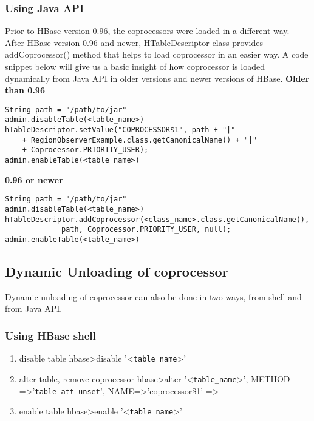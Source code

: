 \documentclass[11pt,a4paper,bibtotoc,idxtotoc,headsepline,footsepline,footexclude,BCOR12mm,DIV13]{scrbook}
\begin{document}
\subsubsection{Using Java API}
Prior to HBase version 0.96, the coprocessors were loaded in a different way. After HBase version 0.96 and newer, HTableDescriptor class provides addCoprocessor() method that helps to load coprocessor in an easier way. A code snippet\cite{loading:coprocessors} below will give us a basic insight of how coprocessor is loaded dynamically from Java API in older versions and newer versions of HBase.
\newline \newline
\textbf{Older than 0.96} \newline
\lstset{language=Java}
\begin{lstlisting}
String path = "/path/to/jar"
admin.disableTable(<table_name>)
hTableDescriptor.setValue("COPROCESSOR$1", path + "|"
    + RegionObserverExample.class.getCanonicalName() + "|"
    + Coprocessor.PRIORITY_USER);
admin.enableTable(<table_name>)
\end{lstlisting}

\textbf{0.96 or newer} \newline
\lstset{language=Java}
\begin{lstlisting}
String path = "/path/to/jar"
admin.disableTable(<table_name>)
hTableDescriptor.addCoprocessor(<class_name>.class.getCanonicalName(),
             path, Coprocessor.PRIORITY_USER, null);
admin.enableTable(<table_name>)
\end{lstlisting}

\subsection{Dynamic Unloading of coprocessor}
Dynamic unloading of coprocessor can also be done in two ways, from shell and from Java API. 

\subsubsection{Using HBase shell}
\begin{enumerate}
    \item disable table
    hbase\textgreater disable '\textless \texttt{table\_name}\textgreater'
    \item alter table, remove coprocessor
    hbase\textgreater alter '\textless \texttt{table\_name}\textgreater', \newline
    METHOD =\textgreater '\texttt{table\_att\_unset}', NAME=\textgreater 'coprocessor\$1' =\textgreater
    \item enable table
    hbase\textgreater enable '\textless \texttt{table\_name}\textgreater'
     
\end{enumerate}
\end{document}
